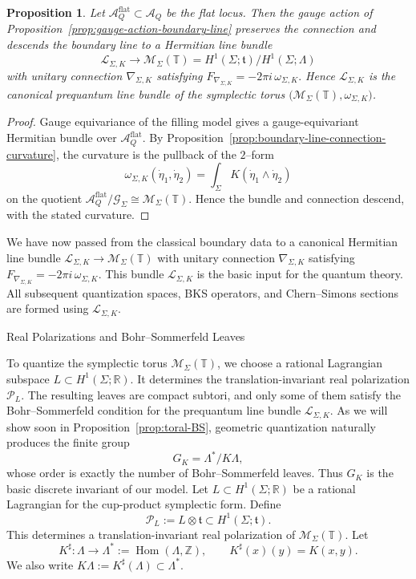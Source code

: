 \documentclass[12pt]{amsart}
\makeatletter
\renewcommand\subsection{\@startsection{subsection}{2}%
  \z@{.5\linespacing\@plus.7\linespacing}{-.5em}%
  {\normalfont\bfseries}}
\numberwithin{equation}{section}
\newtheorem{prop}[theorem]{Proposition}
\DeclareMathOperator{\Hom}{Hom}
\makeatother
\begin{document}
\begin{prop}
\label{prop:canonical-toral-prequantum}
Let $\mathcal A_Q^{\mathrm{flat}}\subset \mathcal A_Q$ be the flat locus.
Then the gauge action of Proposition~\ref{prop:gauge-action-boundary-line}
preserves the connection and descends the boundary line to a Hermitian line bundle
\[
\mathcal L_{\Sigma,K}\longrightarrow
\mathcal M_\Sigma(\mathbb T)=H^1(\Sigma;\mathfrak t)/H^1(\Sigma;\Lambda)
\]
with unitary connection $\nabla_{\Sigma,K}$ satisfying $F_{\nabla_{\Sigma,K}}=-2\pi i\,\omega_{\Sigma,K}.$ Hence $\mathcal L_{\Sigma,K}$ is the canonical prequantum line bundle of the
symplectic torus $\bigl(\mathcal M_\Sigma(\mathbb T),\omega_{\Sigma,K}\bigr)$.
\end{prop}

\begin{proof}
Gauge equivariance of the filling model gives a gauge-equivariant Hermitian bundle
over $\mathcal A_Q^{\mathrm{flat}}$.
By Proposition~\ref{prop:boundary-line-connection-curvature}, the curvature is the
pullback of the $2$--form
\[
\omega_{\Sigma,K}(\dot\eta_1,\dot\eta_2)
=
\int_\Sigma K(\dot\eta_1\wedge \dot\eta_2)
\]
on the quotient $\mathcal A_Q^{\mathrm{flat}}/\mathcal G_\Sigma
\cong \mathcal M_\Sigma(\mathbb T)$.
Hence the bundle and connection descend, with the stated curvature.
\end{proof}

We have now passed from the classical boundary data to a canonical Hermitian
line bundle \(\mathcal L_{\Sigma,K}\to \mathcal M_\Sigma(\mathbb T)\) with unitary
connection \(\nabla_{\Sigma,K}\) satisfying
\(F_{\nabla_{\Sigma,K}}=-2\pi i\,\omega_{\Sigma,K}\). This bundle
\(\mathcal L_{\Sigma,K}\) is the basic input for the quantum theory.
All subsequent quantization spaces, BKS operators, and Chern--Simons sections are
formed using $\mathcal L_{\Sigma,K}$.


\subsection{Real Polarizations and Bohr--Sommerfeld Leaves}

To quantize the symplectic torus \(\mathcal M_\Sigma(\mathbb T)\), we choose a
rational Lagrangian subspace \(L\subset H^1(\Sigma;\mathbb R)\). It determines
the translation-invariant real polarization
\(\mathcal P_L\). The
resulting leaves are compact subtori, and only some of them satisfy the
Bohr--Sommerfeld condition for the prequantum line bundle \(\mathcal L_{\Sigma,K}\). As we will show soon in Proposition~\ref{prop:toral-BS}, geometric quantization naturally produces the finite group
\[
G_K=\Lambda^*/K\Lambda,
\]
whose order is exactly the number of Bohr--Sommerfeld leaves. Thus \(G_K\) is the basic discrete invariant of our model. Let $L\subset H^1(\Sigma;\mathbb R)$ be a rational Lagrangian for the
cup-product symplectic form. Define
\[
\mathcal P_L:=L\otimes \mathfrak t\subset H^1(\Sigma;\mathfrak t).
\]
This determines a translation-invariant real polarization of
$\mathcal M_\Sigma(\mathbb T)$. Let
\[
K^\sharp:\Lambda\longrightarrow \Lambda^*:=\Hom(\Lambda,\mathbb Z),
\qquad
K^\sharp(x)(y)=K(x,y).
\]
We also write $K\Lambda:=K^\sharp(\Lambda)\subset\Lambda^*$.
\end{document}

